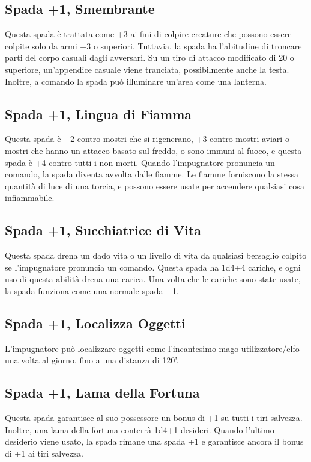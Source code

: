 \documentclass{article}
\begin{document}
\begin{multicols}{2}
\subsection{Spada +1, Smembrante}
Questa spada è trattata come +3 ai fini di colpire creature che possono essere colpite solo da armi +3 o superiori. Tuttavia, la spada ha l'abitudine di troncare parti del corpo casuali dagli avversari. Su un tiro di attacco modificato di 20 o superiore, un'appendice casuale viene tranciata, possibilmente anche la testa. Inoltre, a comando la spada può illuminare un'area come una lanterna.

\subsection{Spada +1, Lingua di Fiamma}
Questa spada è +2 contro mostri che si rigenerano, +3 contro mostri aviari o mostri che hanno un attacco basato sul freddo, o sono immuni al fuoco, e questa spada è +4 contro tutti i non morti. Quando l'impugnatore pronuncia un comando, la spada diventa avvolta dalle fiamme. Le fiamme forniscono la stessa quantità di luce di una torcia, e possono essere usate per accendere qualsiasi cosa infiammabile.

\subsection{Spada +1, Succhiatrice di Vita}
Questa spada drena un dado vita o un livello di vita da qualsiasi bersaglio colpito se l'impugnatore pronuncia un comando. Questa spada ha 1d4+4 cariche, e ogni uso di questa abilità drena una carica. Una volta che le cariche sono state usate, la spada funziona come una normale spada +1.

\subsection{Spada +1, Localizza Oggetti}
L'impugnatore può localizzare oggetti come l'incantesimo mago-utilizzatore/elfo una volta al giorno, fino a una distanza di 120'.

\subsection{Spada +1, Lama della Fortuna}
Questa spada garantisce al suo possessore un bonus di +1 su tutti i tiri salvezza. Inoltre, una lama della fortuna conterrà 1d4+1 desideri. Quando l'ultimo desiderio viene usato, la spada rimane una spada +1 e garantisce ancora il bonus di +1 ai tiri salvezza.


\end{multicols}
\end{document}

